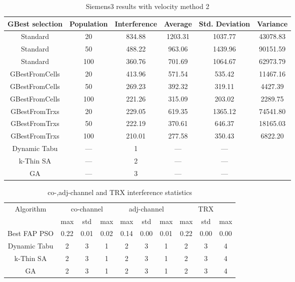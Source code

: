 \begin{table}[H]
\centering
	\begin{tabular}{cccccc}
	\toprule
    GBest selection & Population & Interference & Average & Std. Deviation & Variance \\
    \midrule
    Standard & 20 & 834.88 & 1203.31 & 1037.77 & 43078.83\\
    Standard & 50 & 488.22 & 963.06 & 1439.96 & 90151.59\\
    Standard & 100 & 360.76 & 701.69 & 1064.67 & 62973.79\\
    GBestFromCells & 20 & 413.96 & 571.54 & 535.42 & 11467.16\\
    GBestFromCells & 50 & 269.23 & 392.32 & 319.11 & 4427.39\\
    GBestFromCells & 100 & 221.26 & 315.09 & 203.02 & 2289.75\\
    GBestFromTrxs & 20 & 229.05 & 619.35 & 1365.12 & 74541.80\\
    GBestFromTrxs & 50 & 222.19 & 370.61 & 646.37 & 18165.03\\
    GBestFromTrxs & 100 & 210.01 & 277.58 & 350.43 & 6822.20\\
    \midrule
    Dynamic Tabu & --- & 1 & --- & --- \\
    k-Thin SA & --- & 2 & --- & --- \\
    GA & --- & 3 & --- & --- \\
    \bottomrule
	\end{tabular}
\caption{Siemens3 results with velocity method 2}
\label{tab:siem3m2}
\end{table}
\begin{table}[H]
\centering
	\begin{tabular}{cccccccccc}
	\toprule
    Algorithm & \multicolumn{3}{c}{co-channel} & \multicolumn{3}{c}{adj-channel} & \multicolumn{3}{c}{TRX}\\
              & max & std & max
              & max & std & max
              & max & std & max\\
    \midrule
    Best FAP PSO & 0.22 & 0.01 & 0.02 & 0.14 & 0.00 & 0.01 & 0.22 & 0.00 & 0.00 \\
    Dynamic Tabu & 2 & 3 & 1 & 2 & 3 & 1 & 2 & 3 & 4\\\hline
    k-Thin SA & 2 & 3 & 1 & 2 & 3 & 1 & 2 & 3 & 4\\\hline
    GA & 2 & 3 & 1 & 2 & 3 & 1 & 2 & 3 & 4\\\hline
    \bottomrule
	\end{tabular}
\caption{co-,adj-channel and TRX interference statistics}
\label{tab:stats-siem3m1}
\end{table}
